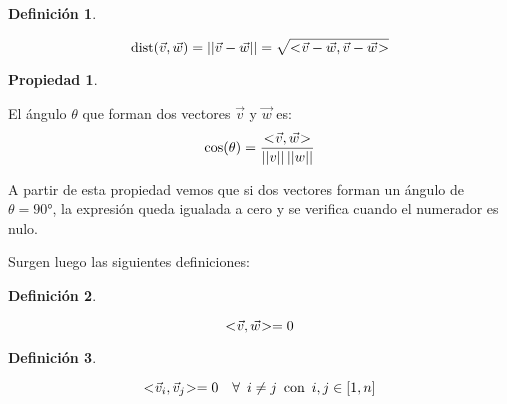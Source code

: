 \documentclass[a5paper,12pt,twoside]{book}
\newtheorem{defn}{{Definición}}[chapter]
\newtheorem{prop}{{Propiedad}}[chapter]
\begin{document}
\begin{mdframed}[style=DefinitionFrame]
    \begin{defn}
    \end{defn}
    \begin{equation*}
        \operatorname{dist}(\Vec{v},\Vec{w}) = {\left|\left| {\Vec{v}-\Vec{w}} \right|\right|} = \sqrt{<\hspace{-0.8mm}\Vec{v}-\Vec{w},\Vec{v}-\Vec{w}\hspace{-0.8mm}>}
    \end{equation*}
\end{mdframed}

\begin{mdframed}[style=PropertyFrame]
    \begin{prop}
    \end{prop}
    El ángulo $\theta$ que forman dos vectores $\Vec{v}$ y $\Vec{w}$ es:
    \begin{equation*}
        \cos(\theta) = \frac{<\hspace{-0.8mm}\Vec{v},\Vec{w}\hspace{-0.8mm}>}{{\left|\left| {v} \right|\right|} \, {\left|\left| {w} \right|\right|}}
    \end{equation*}
\end{mdframed}

A partir de esta propiedad vemos que si dos vectores forman un ángulo de $\theta=\ang{90}$, la expresión queda igualada a cero y se verifica cuando el numerador es nulo.

Surgen luego las siguientes definiciones:

\begin{mdframed}[style=DefinitionFrame]
    \begin{defn}
    \end{defn}
    \begin{equation*}
        <\hspace{-0.8mm}\Vec{v},\Vec{w}\hspace{-0.8mm}> = 0
    \end{equation*}
\end{mdframed}

\begin{mdframed}[style=DefinitionFrame]
    \begin{defn}
    \end{defn}
    \begin{equation*}
        <\hspace{-0.8mm}\Vec{v}_i,\Vec{v}_j\hspace{-0.8mm}> = 0 \quad \forall \enspace  i\neq j \enspace \textrm{con} \enspace i,j \in [1,n]
    \end{equation*}
\end{mdframed}
\end{document}
